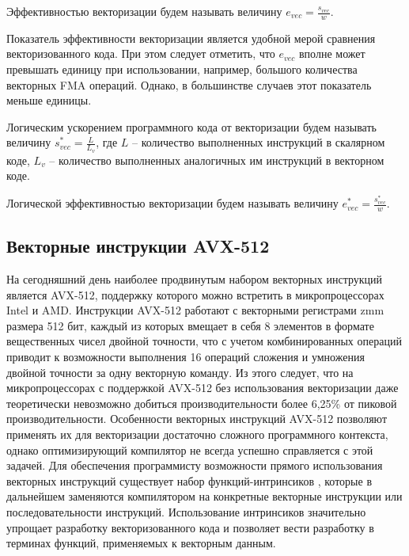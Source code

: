 \begin{definition}
Эффективностью векторизации будем называть величину $e_{vec} = \frac{s_{vec}}{w}$.
\end{definition}

Показатель эффективности векторизации является удобной мерой сравнения векторизованного кода.
При этом следует отметить, что $e_{vec}$ вполне может превышать единицу при использовании, например, большого количества векторных FMA\label{abbr:fma-1} операций.
Однако, в большинстве случаев этот показатель меньше единицы.

\begin{definition}
Логическим ускорением программного кода от векторизации будем называть величину $s_{vec}^{*} = \frac{L}{L_v}$, где $L$ -- количество выполненных инструкций в скалярном коде, $L_v$ -- количество выполненных аналогичных им инструкций в векторном коде.
\end{definition}

\begin{definition}
Логической эффективностью векторизации будем называть величину $e_{vec}^{*} = \frac{s_{vec}^{*}}{w}$.
\end{definition}


\subsection{Векторные инструкции AVX-512}\label{abbr:avx-4}

На сегодняшний день наиболее продвинутым набором векторных инструкций является AVX-512, поддержку которого можно встретить в микропроцессорах Intel и AMD\label{abbr:amd-1}.
Инструкции AVX-512 работают с векторными регистрами zmm размера 512 бит, каждый из которых вмещает в себя 8 элементов в формате вещественных чисел двойной точности, что с учетом комбинированных операций приводит к возможности выполнения 16 операций сложения и умножения двойной точности за одну векторную команду.
Из этого следует, что на микропроцессорах с поддержкой AVX-512 без использования векторизации даже теоретически невозможно добиться производительности более 6,25\% от пиковой производительности.
Особенности векторных инструкций AVX-512 позволяют применять их для векторизации достаточно сложного программного контекста, однако оптимизирующий компилятор не всегда успешно справляется с этой задачей.
Для обеспечения программисту возможности прямого использования векторных инструкций существует набор функций-интринсиков \cite{IntelIntrinsicsGuide}, которые в дальнейшем заменяются компилятором на конкретные векторные инструкции или последовательности инструкций.
Использование интринсиков значительно упрощает разработку векторизованного кода и позволяет вести разработку в терминах функций, применяемых к векторным данным.

